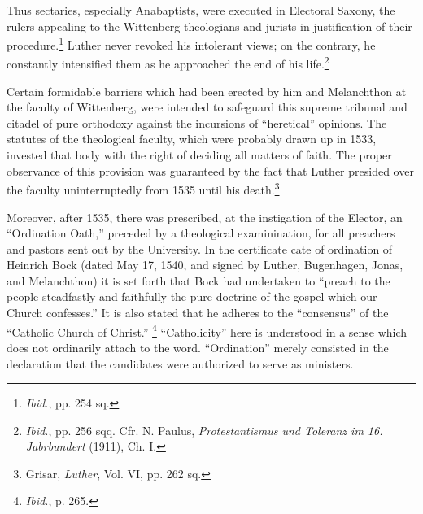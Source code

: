 Thus sectaries, especially Anabaptists, were executed in Electoral
Saxony, the rulers appealing to the Wittenberg theologians and jurists
in justification of their procedure.\footnote{\textit{Ibid.}, pp. 254 sq.}
 Luther never revoked his intolerant
views; on the contrary, he constantly intensified them as he
approached the end of his life.\footnote
{\textit{Ibid.}, pp. 256 sqq. Cfr. N. Paulus, \textit{Protestantismus und Toleranz im 16. Jabrbundert}
(1911), Ch. I.}

Certain formidable barriers which had been erected by him and
Melanchthon at the faculty of Wittenberg, were intended to safeguard this
supreme tribunal and citadel of pure orthodoxy against
the incursions of “heretical” opinions. The statutes of the theological
faculty, which were probably drawn up in 1533, invested that body
with the right of deciding all matters of faith. The proper observance
of this provision was guaranteed by the fact that Luther presided
over the faculty uninterruptedly from 1535 until his death.\footnote
{Grisar, \textit{Luther}, Vol. VI, pp. 262 sq.}

Moreover, after 1535, there was prescribed, at the instigation of the Elector,
an “Ordination Oath,” preceded by a theological examinination,
for all preachers and pastors sent out by the University. In the certificate
cate of ordination of Heinrich Bock (dated May 17, 1540, and signed
by Luther, Bugenhagen, Jonas, and Melanchthon) it is set forth that
Bock had undertaken to “preach to the people steadfastly and faithfully
the pure doctrine of the gospel which our Church confesses.”
It is also stated that he adheres to the “consensus” of the “Catholic
Church of Christ.”
\footnote{\textit{Ibid.}, p. 265.}
“Catholicity” here is understood in a sense
which does not ordinarily attach to the word. “Ordination” merely
consisted in the declaration that the candidates were authorized to
serve as ministers.

